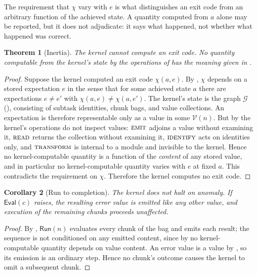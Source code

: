 \documentclass[11pt,a4paper]{article}
\theoremstyle{thmstyle}
\newtheorem{theorem}{Theorem}[section]
\newtheorem{corollary}[theorem]{Corollary}
\theoremstyle{definition}
\theoremstyle{remark}
\newcommand{\Node}{n}
\newcommand{\Vals}{\mathcal{V}}
\newcommand{\Graph}{\mathcal{G}}
\newcommand{\Run}{\mathsf{Run}}
\newcommand{\Eval}{\mathsf{Eval}}
\newcommand{\emit}{\textsc{emit}}
\newcommand{\readop}{\textsc{read}}
\newcommand{\ident}{\textsc{identify}}
\newcommand{\transf}{\textsc{transform}}
\begin{document}
The requirement that $\chi$ vary with $e$ is what distinguishes an exit code
from an arbitrary function of the achieved state. A quantity computed from
$a$ alone may be reported, but it does not adjudicate: it says what
happened, not whether what happened was correct.

\begin{theorem}[Inertia]
\label{thm:inertia}
The kernel cannot compute an exit code. No quantity computable from the
kernel's state by the operations of  has the meaning given
in .
\end{theorem}

\begin{proof}
Suppose the kernel computed an exit code $\chi(a,e)$. By
, $\chi$ depends on a stored expectation $e$ in the sense
that for some achieved state $a$ there are expectations $e\ne e'$ with
$\chi(a,e)\ne\chi(a,e')$. The kernel's state is the graph $\Graph$
(), consisting of subtask identities, chunk bags, and value
collections. An expectation is therefore representable only as a value in
some $\Vals(\Node)$. But by  the kernel's operations do not
inspect values: $\emit$ adjoins a value without examining it, $\readop$
returns the collection without examining it, $\ident$ acts on identities
only, and $\transf$ is internal to a module and invisible to the kernel.
Hence no kernel-computable quantity is a function of the \emph{content} of
any stored value, and in particular no kernel-computable quantity varies
with $e$ at fixed $a$. This contradicts the requirement on $\chi$. Therefore
the kernel computes no exit code.
\end{proof}

\begin{corollary}[Run to completion]
\label{cor:completion}
The kernel does not halt on anomaly. If $\Eval(c)$ raises, the resulting
error value is emitted like any other value, and execution of the remaining
chunks proceeds unaffected.
\end{corollary}

\begin{proof}
By , $\Run(\Node)$ evaluates every chunk of the bag and emits
each result; the sequence is not conditioned on any emitted content, since
by  no kernel-computable quantity depends on value
content. An error value is a value by , so its emission is
an ordinary step. Hence no chunk's outcome causes the kernel to omit a
subsequent chunk.
\end{proof}
\end{document}
